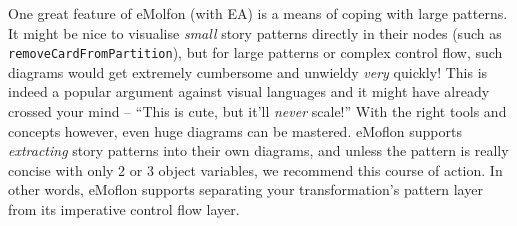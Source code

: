 One great feature of eMolfon (with EA) is a means of coping with large patterns. It might be nice to visualise \emph{small} story patterns directly in their
nodes (such as \texttt{removeCardFromPartition}), but for large patterns or complex control flow, such diagrams would get extremely cumbersome and unwieldy
\emph{very} quickly! This is indeed a popular argument against visual languages and it might have already crossed your mind -- ``This is cute, but it'll
\emph{never} scale!'' With the right tools and concepts however, even huge diagrams can be mastered. eMoflon supports \emph{extracting} story patterns into
their own diagrams, and unless the pattern is really concise with only 2 or 3 object variables, we recommend this course of action. In other words, eMoflon
supports separating your transformation's pattern layer from its imperative control flow layer.


